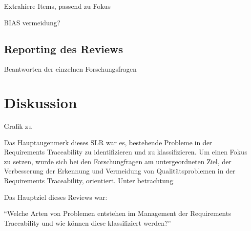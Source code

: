 Extrahiere Items, passend zu Fokus

BIAS vermeidung?

\subsection{Reporting des Reviews}

Beantworten der einzelnen Forschungsfragen

\section{Diskussion}

Grafik zu

Das Hauptaugenmerk dieses SLR war es, bestehende Probleme in der Requirements Traceability zu identifizieren und zu klassifizieren. Um einen Fokus zu setzen, wurde sich bei den Forschungfragen am untergeordneten Ziel, der Verbesserung der Erkennung und Vermeidung von Qualitätsproblemen in der Requirements Traceability, orientiert. Unter betrachtung 

Das Hauptziel dieses Reviews war:

\begin{center}
\enquote{Welche Arten von Problemen entstehen im Management der Requirements Traceability und wie können diese klassifiziert werden?}
\end{center}

